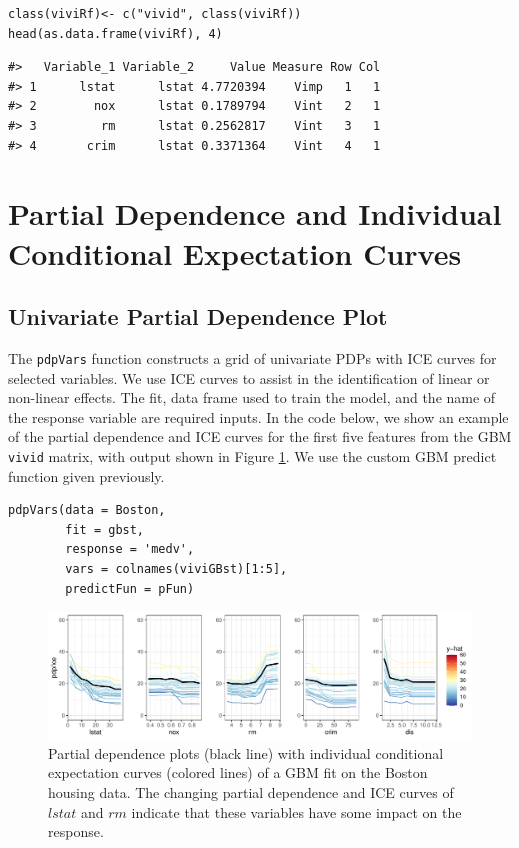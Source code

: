 \begin{verbatim}
class(viviRf)<- c("vivid", class(viviRf))
head(as.data.frame(viviRf), 4)
\end{verbatim}

\begin{verbatim}
#>   Variable_1 Variable_2     Value Measure Row Col
#> 1      lstat      lstat 4.7720394    Vimp   1   1
#> 2        nox      lstat 0.1789794    Vint   2   1
#> 3         rm      lstat 0.2562817    Vint   3   1
#> 4       crim      lstat 0.3371364    Vint   4   1
\end{verbatim}

\hypertarget{GPDP}{%
\section{Partial Dependence and Individual Conditional Expectation Curves}\label{GPDP}}

\hypertarget{univariate-partial-dependence-plot}{%
\subsection{Univariate Partial Dependence Plot}\label{univariate-partial-dependence-plot}}

The \texttt{pdpVars} function constructs a grid of univariate PDPs with ICE curves for selected variables. We use ICE curves to assist in the identification of linear or non-linear effects. The fit, data frame used to train the model, and the name of the response variable are required inputs. In the code below, we show an example of the partial dependence and ICE curves for the first five features from the GBM \texttt{vivid} matrix, with output shown in Figure \ref{fig:pdpRf}. We use the custom GBM predict function given previously.

\begin{verbatim}
pdpVars(data = Boston,
        fit = gbst,
        response = 'medv',
        vars = colnames(viviGBst)[1:5],
        predictFun = pFun)
\end{verbatim}

\begin{figure}

{\centering \includegraphics[width=1\linewidth]{vivid_files/figure-latex/pdpRf-1} 

}

\caption{Partial dependence plots (black line) with individual conditional expectation curves (colored lines) of a GBM fit on the Boston housing data. The changing partial dependence and ICE curves of $lstat$ and $rm$ indicate that these variables have some impact on the response.}\label{fig:pdpRf}
\end{figure}

